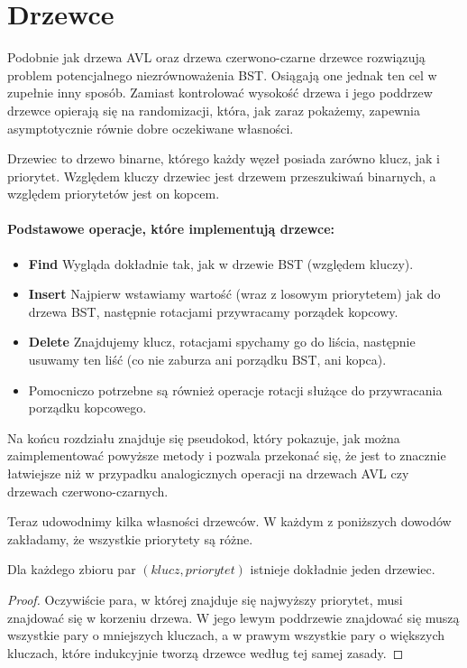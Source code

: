 \section{Drzewce}

\label{sec:drzewce}

Podobnie jak drzewa AVL oraz drzewa czerwono-czarne drzewce rozwiązują problem potencjalnego niezrównoważenia BST.
Osiągają one jednak ten cel w zupełnie inny sposób.
Zamiast kontrolować wysokość drzewa i jego poddrzew drzewce opierają się na randomizacji, która, jak zaraz pokażemy, zapewnia asymptotycznie równie dobre oczekiwane własności. 

\begin{definition} 
Drzewiec to drzewo binarne, którego każdy węzeł posiada zarówno klucz, jak i priorytet.
Względem kluczy drzewiec jest drzewem przeszukiwań binarnych, a względem priorytetów jest on kopcem.
\end{definition}

\paragraph{Podstawowe operacje, które implementują drzewce:}
\begin{itemize}
    \item \textbf{Find} Wygląda dokładnie tak, jak w drzewie BST (względem kluczy).
    \item \textbf{Insert} Najpierw wstawiamy wartość (wraz z losowym priorytetem) jak do drzewa BST, następnie rotacjami przywracamy porządek kopcowy.
    \item \textbf{Delete} Znajdujemy klucz, rotacjami spychamy go do liścia, następnie usuwamy ten liść (co nie zaburza ani porządku BST, ani kopca).
    \item Pomocniczo potrzebne są również operacje rotacji służące do przywracania porządku kopcowego.
\end{itemize}

Na końcu rozdziału znajduje się pseudokod, który pokazuje, jak można zaimplementować powyższe metody i pozwala przekonać się, że jest to znacznie łatwiejsze niż w przypadku analogicznych operacji na drzewach AVL czy drzewach czerwono-czarnych.

Teraz udowodnimy kilka własności drzewców.
W każdym z poniższych dowodów zakładamy, że wszystkie priorytety są różne.

\begin{theorem}
\label{unique treap}
Dla każdego zbioru par $(klucz, priorytet)$ istnieje dokładnie jeden drzewiec.
\end{theorem}
\begin{proof}
Oczywiście para, w której znajduje się najwyższy priorytet, musi znajdować się w korzeniu drzewa.
W jego lewym poddrzewie znajdować się muszą wszystkie pary o mniejszych kluczach, a w prawym wszystkie pary o większych kluczach, które indukcyjnie tworzą drzewce według tej samej zasady.
\end{proof}

